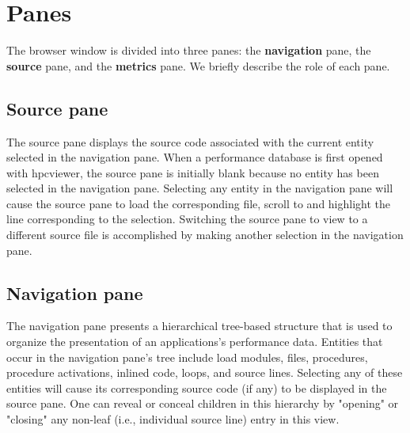 \documentclass[a4paper,11pt]{article}
\begin{document}
\section{Panes}

The browser window is divided into three panes: the \textbf{navigation}  pane, the \textbf{source} pane, and the \textbf{metrics} pane. We briefly describe the role of  each pane. 

\subsection{Source pane}  The source pane displays the source code associated with  the current entity selected in the navigation pane. When a performance  database is first opened with hpcviewer, the source pane is initially  blank because no entity has been selected in the navigation pane. Selecting  any entity in the navigation pane will cause the source pane to load the  corresponding file, scroll to and highlight the line corresponding to the  selection. Switching the source pane to view to a different source file  is accomplished by making another selection in the navigation pane.   

\subsection{Navigation pane} The navigation pane presents a hierarchical tree-based structure that is used to organize the presentation of an applications's   performance data. Entities that occur in the navigation pane's  tree include load modules, files, procedures, procedure activations, inlined code, loops, and source lines. Selecting any of these entities will  cause its corresponding source code (if any) to be displayed in the  source pane. One can reveal or conceal children in this hierarchy by  "opening" or "closing" any non-leaf (i.e., individual source line) entry  in this view.   
\end{document}
